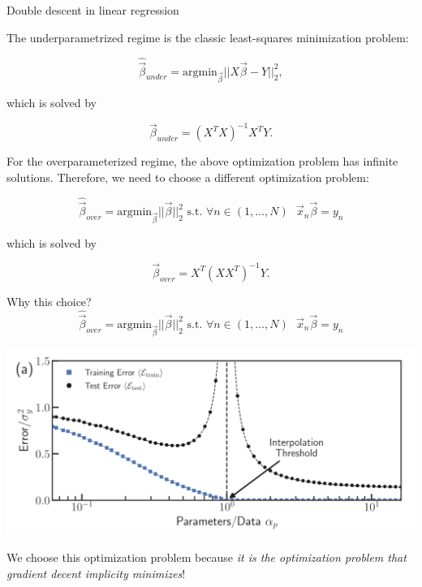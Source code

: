 \documentclass{beamer}
\begin{document}
\begin{frame}{Double descent in linear regression}

    The underparametrized regime is the classic least-squares minimization problem:

    $$\hat{\vec{\beta}}_{under} = \text{arg} \text{min}_{\vec{\beta}}||X \vec{\beta} - Y||^2_2, $$

    which is solved by

    $$\vec{\beta}_{under} = (X^T X)^{-1} X^T Y.$$

    \pause

    For the overparameterized regime, the above optimization problem has infinite solutions. Therefore, we need to choose a different optimization problem:

    $$\hat{\vec{\beta}}_{over} = \text{arg} \text{min}_{\vec{\beta}}||\vec{\beta}||^2_2 \text{   s.t.   } \forall n \in (1,\dots,N) \text{   } \vec{x}_n \vec{\beta} = y_n$$

    which is solved by

    $$\vec{\beta}_{over} = X^T (X X^T)^{-1}Y.$$

\end{frame}


\begin{frame}{Why this choice?}
    $$\hat{\vec{\beta}}_{over} = \text{arg} \text{min}_{\vec{\beta}}||\vec{\beta}||^2_2 \text{   s.t.   } \forall n \in (1,\dots,N) \text{   } \vec{x}_n \vec{\beta} = y_n$$

    \pause
    
    \begin{center}
        \includegraphics[scale=0.20]{ddd.png}
    \end{center}
    
    \pause

    We choose this optimization problem because \emph{it is the optimization problem that gradient decent implicity minimizes}!
\end{frame}
\end{document}
